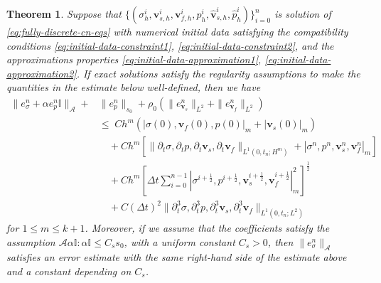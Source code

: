 \documentclass[10pt,letterpaper]{amsart}
\theoremstyle{plain} %
\newtheorem{theorem}{Theorem}[section] %
\theoremstyle{remark} %
\newcommand{\vect}[1]{\mathbf{#1}}
\newcommand{\Id}{\mathbb{I}} %
\newcommand{\Ael}{\mathcal{A}} %
\begin{document}
\begin{theorem}\label{thm:discrete-error-estimates}
Suppose that $\{(\sigma_{h}^i, \vect{v}_{s,h}^i, \vect{v}_{f,h}^i, p_{h}^i, \widehat{\vect{v}}_{s,h}^i, \widehat{p}_{h}^i)\}_{i=0}^{n}$ is solution of \eqref{eq:fully-discrete-cn-eqs} with numerical initial data satisfying the compatibility conditions \eqref{eq:initial-data-constraint1}, \eqref{eq:initial-data-constraint2}, and the approximations properties \eqref{eq:initial-data-approximation1}, \eqref{eq:initial-data-approximation2}. If exact solutions satisfy the regularity assumptions to make the quantities in the estimate below well-defined, then we have 
%
\begin{align*}
	\| e_{\sigma}^n + \alpha e_{p}^n\Id \|_{\Ael} + &\|e_{p}^n\|_{s_0} + \rho_0 (\|e_{\vect{v}_{s}}^n\|_{L^2} + \|e_{\vect{v}_{f}}^n\|_{L^2} )
	\;
	\\
	&\le \; C h^m (| \sigma(0), \vect{v}_{f}(0), p(0)|_{m} + |\vect{v}_{s}(0)|_{m})
	\\ 
	&\quad + C h^m \left[  \| \partial_t \sigma, \partial_t p, \partial_t \vect{v}_s, \partial_t \vect{v}_f \|_{L^1(0, t_{n}; H^m)} + | \sigma^n, p^n, \vect{v}_s^n, \vect{v}_f^n |_{m} \right]
	\\
	&\quad + C h^m \left[ \Delta t \sum_{i=0}^{n-1}| \sigma^{i+\frac 12}, p^{i+\frac 12}, \vect{v}_s^{i+\frac 12}, \vect{v}_f^{i+\frac 12} |_{m}^2 \right]^{\frac 12}
	\\
	&\quad + C(\Delta t)^2 \| \partial_t^3 \sigma, \partial_t^3 p, \partial_t^3 \vect{v}_s, \partial_t^3 \vect{v}_f \|_{L^1(0, t_{n}; L^2)} 
\end{align*}
for $1 \le m \le k+1$. Moreover, if we assume that the coefficients satisfy the assumption $\Ael \alpha \Id : \alpha \Id \le C_s s_0$, with a uniform constant $C_s>0$, then $\| e_{\sigma}^n \|_{\Ael}$ satisfies an error estimate with the same right-hand side of the estimate above and a constant depending on $C_s$. 
\end{theorem}
%
\end{document}
